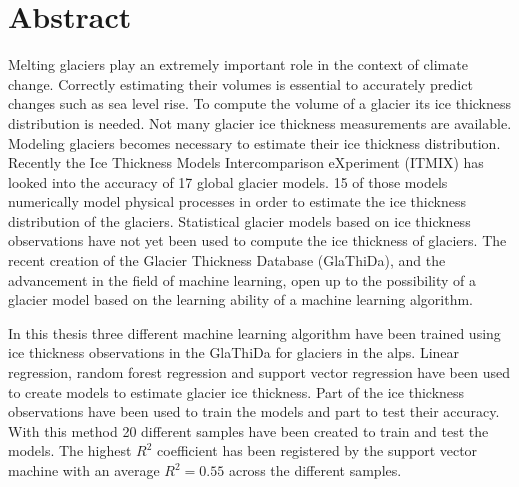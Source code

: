 \chapter*{Abstract}
\thispagestyle{plain}
Melting glaciers play an extremely important role in the context of climate change. Correctly estimating their volumes is essential to accurately predict changes such as sea level rise. To compute the volume of a glacier its ice thickness distribution is needed. Not many glacier ice thickness measurements are available. Modeling glaciers becomes necessary to estimate their ice thickness distribution. Recently the Ice Thickness Models Intercomparison eXperiment (ITMIX) has looked into the accuracy of 17 global glacier models. 15 of those models numerically model physical processes in order to estimate the ice thickness distribution of the glaciers. Statistical glacier models based on ice thickness observations have not yet been used to compute the ice thickness of glaciers. The recent creation of the Glacier Thickness Database (GlaThiDa), and the advancement in the field of machine learning, open up to the possibility of a glacier model based on the learning ability of a machine learning algorithm.

In this thesis three different machine learning algorithm have been trained using ice thickness observations in the GlaThiDa for glaciers in the alps. Linear regression, random forest regression and support vector regression have been used to create models to estimate glacier ice thickness. Part of the ice thickness observations have been used to train the models and part to test their accuracy. With this method 20 different samples have been created to train and test the models. The highest $R^2$ coefficient has been registered by the support vector machine with an average $R^2=0.55$ across the different samples. 

